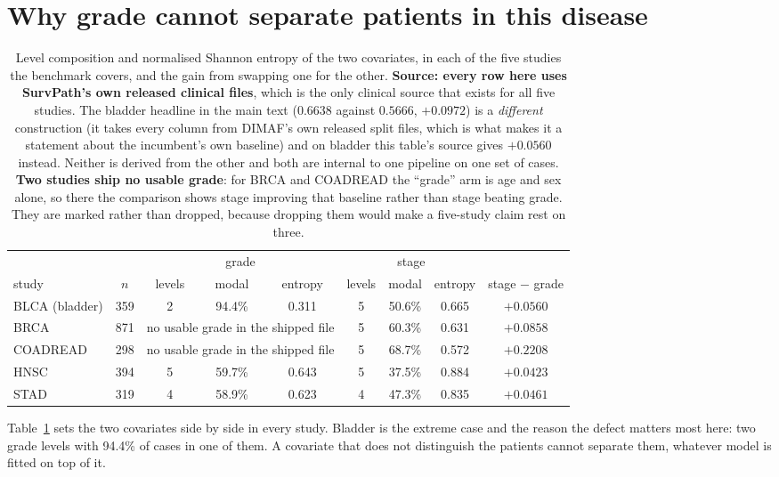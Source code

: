 \documentclass[11pt]{article}
\begin{document}
\section{Why grade cannot separate patients in this disease}
\begin{table}[h]
\centering
{\small
\setlength{\tabcolsep}{4pt}
\begin{tabular}{lcccccccc}
\toprule
 & & \multicolumn{3}{c}{grade} & \multicolumn{3}{c}{stage} & \\
\cmidrule(lr){3-5}\cmidrule(lr){6-8}
study & $n$ & levels & modal & entropy & levels & modal & entropy & stage $-$ grade \\
\midrule
BLCA (bladder) & 359 & 2 & 94.4\% & 0.311 & 5 & 50.6\% & 0.665 & $+0.0560$ \\
BRCA & 871 & \multicolumn{3}{c}{no usable grade in the shipped file} & 5 & 60.3\% & 0.631 & $+0.0858$ \\
COADREAD & 298 & \multicolumn{3}{c}{no usable grade in the shipped file} & 5 & 68.7\% & 0.572 & $+0.2208$ \\
HNSC & 394 & 5 & 59.7\% & 0.643 & 5 & 37.5\% & 0.884 & $+0.0423$ \\
STAD & 319 & 4 & 58.9\% & 0.623 & 4 & 47.3\% & 0.835 & $+0.0461$ \\
\bottomrule
\end{tabular}}
\caption{Level composition and normalised Shannon entropy of the two covariates, in each of the five
studies the benchmark covers, and the gain from swapping one for the other. \textbf{Source: every
row here uses SurvPath's own released clinical files}, which is the only clinical source
that exists for all five studies. The bladder headline in the main text ($0.6638$ against $0.5666$,
$+0.0972$) is a \emph{different} construction (it takes every column from DIMAF's own released split files, which is what makes it a statement about the incumbent's own baseline) and on
bladder this table's source gives $+0.0560$ instead. Neither is derived from the other and both are
internal to one pipeline on one set of cases. \textbf{Two studies ship no usable grade}: for BRCA
and COADREAD the ``grade'' arm is age and sex alone, so there the comparison shows stage improving
that baseline rather than stage beating grade. They are marked rather than dropped, because
dropping them would make a five-study claim rest on three.}
\label{tab:sup-entropy}
\end{table}

\noindent Table~\ref{tab:sup-entropy} sets the two covariates side by side in every study.
Bladder is the extreme case and the reason the defect matters most here: two
grade levels with 94.4\% of cases in one of them. A covariate that does not distinguish the
patients cannot separate them, whatever model is fitted on top of it.
\end{document}
